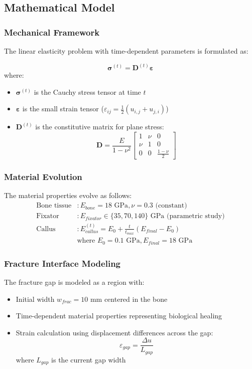 \documentclass{article}
\begin{document}
\subsection{Mathematical Model}

\subsubsection{Mechanical Framework}

The linear elasticity problem with time-dependent parameters is formulated as:

\[
  \bm{\sigma}^{(t)} = \mathbf{D}^{(t)}\bm{\varepsilon}
\]
where:
\begin{itemize}
  \item $\bm{\sigma}^{(t)}$ is the Cauchy stress tensor at time $t$
  \item $\bm{\varepsilon}$ is the small strain tensor ($\varepsilon_{ij} = \frac{1}{2}(u_{i,j} + u_{j,i})$)
  \item $\mathbf{D}^{(t)}$ is the constitutive matrix for plane stress:
        \[
          \mathbf{D} = \frac{E}{1-\nu^2}\begin{bmatrix}
            1   & \nu & 0               \\
            \nu & 1   & 0               \\
            0   & 0   & \frac{1-\nu}{2}
          \end{bmatrix}
        \]
\end{itemize}

\subsubsection{Material Evolution}
The material properties evolve as follows:
\begin{align*}
  \text{Bone tissue} & : E_{bone} = 18 \text{ GPa}, \nu = 0.3 \text{ (constant)}        \\
  \text{Fixator}     & : E_{fixator} \in \{35, 70, 140\} \text{ GPa (parametric study)} \\
  \text{Callus}      & : E_{callus}^{(t)} = E_0 + \frac{t}{t_{max}}(E_{final}-E_0)      \\
                     & \text{where } E_0 = 0.1 \text{ GPa}, E_{final} = 18 \text{ GPa}
\end{align*}

\subsubsection{Fracture Interface Modeling}
The fracture gap is modeled as a region with:
\begin{itemize}
  \item Initial width $w_{frac} = 10$ mm centered in the bone
  \item Time-dependent material properties representing biological healing
  \item Strain calculation using displacement differences across the gap:
        \[
          \varepsilon_{gap} = \frac{\Delta u}{L_{gap}}
        \]
        where $L_{gap}$ is the current gap width
\end{itemize}
\end{document}
